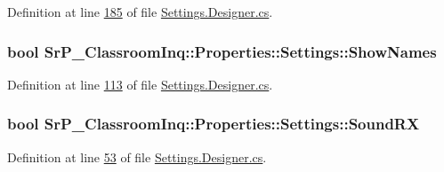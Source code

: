 \-Definition at line \hyperlink{_settings_8_designer_8cs_source_l00185}{185} of file \hyperlink{_settings_8_designer_8cs_source}{\-Settings.\-Designer.\-cs}.

\hypertarget{class_sr_p___classroom_inq_1_1_properties_1_1_settings_abb110d7ebcceac8e89e8e7fced9da2b4}{
\subsubsection[{\-Show\-Names}]{\setlength{\rightskip}{0pt plus 5cm}bool \-Sr\-P\-\_\-\-Classroom\-Inq\-::\-Properties\-::\-Settings\-::\-Show\-Names}}
\label{class_sr_p___classroom_inq_1_1_properties_1_1_settings_abb110d7ebcceac8e89e8e7fced9da2b4}


\-Definition at line \hyperlink{_settings_8_designer_8cs_source_l00113}{113} of file \hyperlink{_settings_8_designer_8cs_source}{\-Settings.\-Designer.\-cs}.

\hypertarget{class_sr_p___classroom_inq_1_1_properties_1_1_settings_ab0ec9af30232e0f23083548e3b7242a2}{
\subsubsection[{\-Sound\-R\-X}]{\setlength{\rightskip}{0pt plus 5cm}bool \-Sr\-P\-\_\-\-Classroom\-Inq\-::\-Properties\-::\-Settings\-::\-Sound\-R\-X}}
\label{class_sr_p___classroom_inq_1_1_properties_1_1_settings_ab0ec9af30232e0f23083548e3b7242a2}


\-Definition at line \hyperlink{_settings_8_designer_8cs_source_l00053}{53} of file \hyperlink{_settings_8_designer_8cs_source}{\-Settings.\-Designer.\-cs}.

